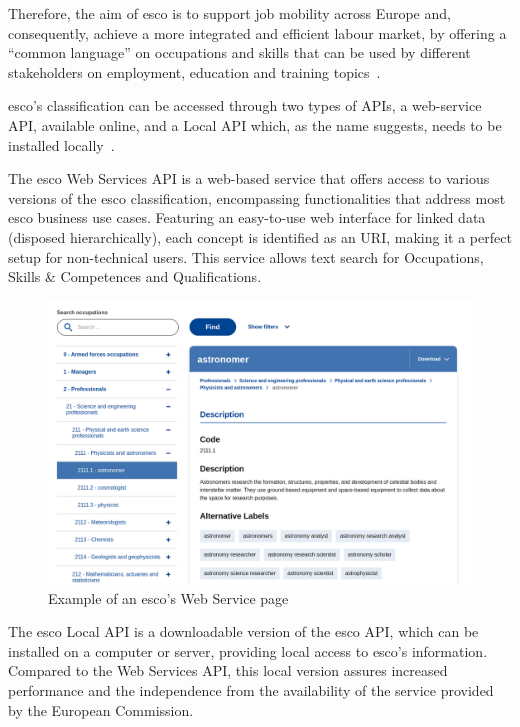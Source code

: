 Therefore, the aim of \ac{esco} is to support job mobility across Europe and, consequently, achieve a more integrated and efficient labour market, by offering a “common language” on occupations and skills that can be used by different stakeholders on employment, education and training topics~\cite{what_esco}. 

\ac{esco}’s classification can be accessed through two types of APIs, a web-service API, available online, and a Local API which, as the name suggests, needs to be installed locally~\cite{esco_api}.

The \ac{esco} Web Services API is a web-based service that offers access to various versions of the \ac{esco} classification, encompassing functionalities that address most \ac{esco} business use cases. Featuring an easy-to-use web interface for linked data (disposed hierarchically), each concept is identified as an URI, making it a perfect setup for non-technical users. This service allows text search for Occupations, Skills \& Competences and Qualifications.

\begin{figure}[H]
    \centering
    \includegraphics[width=15cm]{figs/esco_web_service.png}
    \caption{Example of an \acs{esco}'s Web Service page~\cite{astronomer}}
    \label{fig:esco_web_service}
\end{figure}

The \ac{esco} Local API is a downloadable version of the \ac{esco} API, which can be installed on a computer or server, providing local access to \ac{esco}’s information. Compared to the Web Services API, this local version assures increased performance and the independence from the availability of the service provided by the European Commission.

